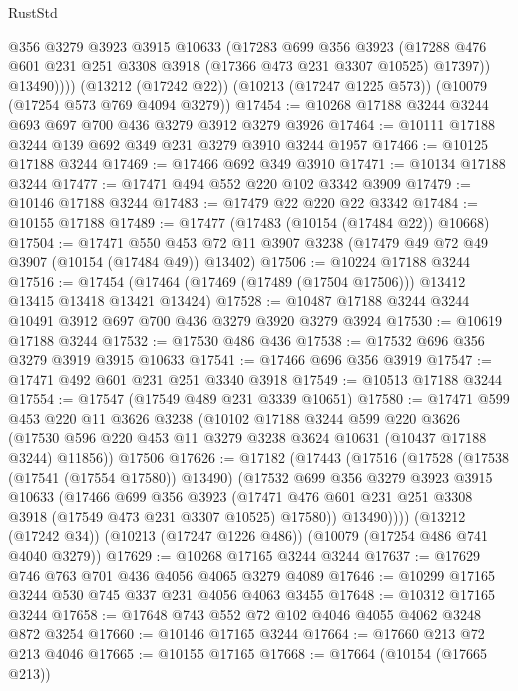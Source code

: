 \begin{lexlean}{RustStd}
\begin{coremodule}
{\begin{coremodule}
{{{{{{{{{{{{{{{{{{{{{{{{{{            @356
            @3279
            @3923
            @3915
            @10633
            (@17283
              @699
              @356
              @3923
              (@17288 @476 @601 @231 @251 @3308 @3918 (@17366 @473 @231 @3307 @10525) @17397))
            @13490))))
    (@13212 (@17242 @22))
    (@10213 (@17247 @1225 @573))
    (@10079 (@17254 @573 @769 @4094 @3279))
@17454 := @10268 @17188 @3244 @3244 @693 @697 @700 @436 @3279 @3912 @3279 @3926
@17464 := @10111 @17188 @3244 @139 @692 @349 @231 @3279 @3910 @3244 @1957
@17466 := @10125 @17188 @3244
@17469 := @17466 @692 @349 @3910
@17471 := @10134 @17188 @3244
@17477 := @17471 @494 @552 @220 @102 @3342 @3909
@17479 := @10146 @17188 @3244
@17483 := @17479 @22 @220 @22 @3342
@17484 := @10155 @17188
@17489 := @17477 (@17483 (@10154 (@17484 @22)) @10668)
@17504 := @17471
    @550
    @453
    @72
    @11
    @3907
    @3238
    (@17479 @49 @72 @49 @3907 (@10154 (@17484 @49)) @13402)
@17506 := @10224 @17188 @3244
@17516 := @17454 (@17464 (@17469 (@17489 (@17504 @17506))) @13412 @13415 @13418 @13421 @13424)
@17528 := @10487 @17188 @3244 @3244 @10491 @3912 @697 @700 @436 @3279 @3920 @3279 @3924
@17530 := @10619 @17188 @3244
@17532 := @17530 @486 @436
@17538 := @17532 @696 @356 @3279 @3919 @3915 @10633
@17541 := @17466 @696 @356 @3919
@17547 := @17471 @492 @601 @231 @251 @3340 @3918
@17549 := @10513 @17188 @3244
@17554 := @17547 (@17549 @489 @231 @3339 @10651)
@17580 := @17471
    @599
    @453
    @220
    @11
    @3626
    @3238
    (@10102
      @17188
      @3244
      @599
      @220
      @3626
      (@17530 @596 @220 @453 @11 @3279 @3238 @3624 @10631 (@10437 @17188 @3244) @11856))
    @17506
@17626 := @17182
    (@17443
      (@17516
        (@17528
          (@17538 (@17541 (@17554 @17580)) @13490)
          (@17532
            @699
            @356
            @3279
            @3923
            @3915
            @10633
            (@17466
              @699
              @356
              @3923
              (@17471 @476 @601 @231 @251 @3308 @3918 (@17549 @473 @231 @3307 @10525) @17580))
            @13490))))
    (@13212 (@17242 @34))
    (@10213 (@17247 @1226 @486))
    (@10079 (@17254 @486 @741 @4040 @3279))
@17629 := @10268 @17165 @3244 @3244
@17637 := @17629 @746 @763 @701 @436 @4056 @4065 @3279 @4089
@17646 := @10299 @17165 @3244 @530 @745 @337 @231 @4056 @4063 @3455
@17648 := @10312 @17165 @3244
@17658 := @17648 @743 @552 @72 @102 @4046 @4055 @4062 @3248 @872 @3254
@17660 := @10146 @17165 @3244
@17664 := @17660 @213 @72 @213 @4046
@17665 := @10155 @17165
@17668 := @17664 (@10154 (@17665 @213))
}}}}}}}}}}}}}}}}}}}}}}}}}}
\end{coremodule}}
\end{coremodule}
\end{lexlean}
